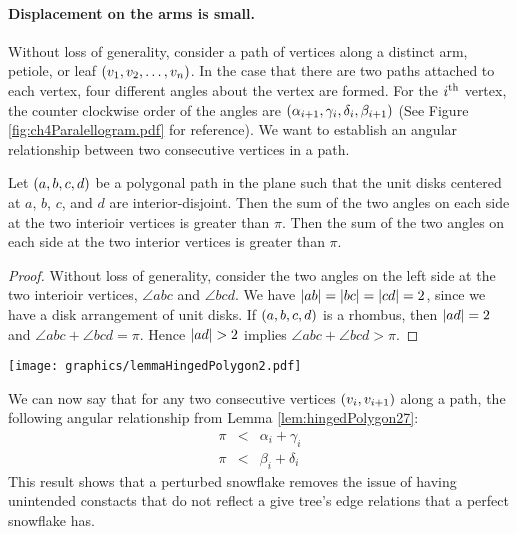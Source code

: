 \paragraph{Displacement on the arms is small.}
Without loss of generality, consider a path of vertices along a distinct arm, petiole, or leaf $\left( v_1, v_2, \ldots, v_n \right)$.  
In the case that there are two paths attached to each vertex, four different angles about the vertex are formed.  
For the $i^\text{th}$ vertex, the counter clockwise order of the angles are $\left( \alpha_{i+1}, \gamma_i, \delta_i, \beta_{i+1} \right)$ (See Figure \ref{fig:ch4Paralellogram.pdf} for reference).  
We want to establish an angular relationship between two consecutive vertices in a path.
\begin{lem}\label{lem:hingedPolygon27}
Let $\left( a,b,c,d \right)$ be a polygonal path in the plane such that the unit disks centered at $a$, $b$, $c$, and $d$ are interior-disjoint.  Then the sum of the two angles on each side at the two interioir vertices is greater than $\pi$. Then the sum of the two angles on each side at the two interior vertices is greater than $\pi$.
\end{lem}
\begin{proof}
Without loss of generality, consider the two angles on the left side  at the two interioir vertices, $\angle abc$ and $\angle bcd$.  We have $\left\vert ab \right\vert = \left\vert bc \right\vert = \left\vert cd \right\vert = 2$, since we have a disk arrangement of unit disks.  If $\left( a,b,c,d \right)$ is a rhombus, then $\left\vert ad \right\vert=2$ and $\angle abc + \angle bcd = \pi$.  Hence $\left\vert ad \right\vert>2$ implies $\angle abc + \angle bcd > \pi$. 
\end{proof}

\begin{minipage}{\linewidth}
\begin{center}
\texttt{[image: graphics/lemmaHingedPolygon2.pdf]}
\label{fig:lemmaHingedPolygon2.pdf}
\end{center}
\end{minipage}

We can now say that for any two consecutive vertices $\left( v_i, v_{i+1} \right)$ along a path, the following angular relationship from Lemma \ref{lem:hingedPolygon27}:
$$ 
\begin{array}{rcl}
\pi &<& \alpha_i + \gamma_i \\
\pi &<& \beta_i + \delta_i
\end{array}
$$
This result shows that a perturbed snowflake removes the issue of having unintended constacts that do not reflect a give tree's edge relations that a perfect snowflake has.  

